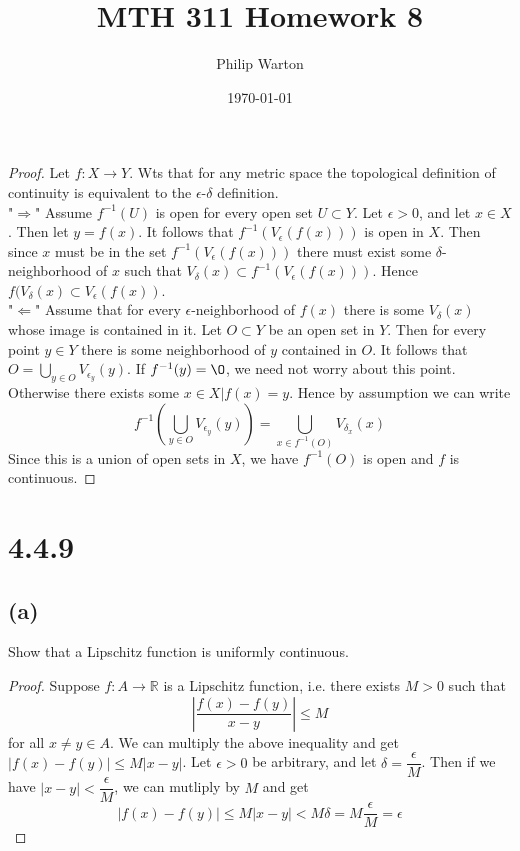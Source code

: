 \documentclass{article}
\begin{document}
\title{MTH 311 Homework 8}
\author{Philip Warton}
\date{\today}
\maketitle

\begin{proof}
Let $f: X \rightarrow Y$. Wts that for any metric space the topological definition of continuity is equivalent to the $\epsilon$-$\delta$ definition. \\
"$\Rightarrow$" Assume $f^{-1}(U)$ is open for every open set $U \subset Y$. Let $\epsilon > 0$, and let $x \in X$. Then let $y = f(x)$. It follows that $f^{-1}(V_\epsilon(f(x)))$ is open in $X$. Then since $x$ must be in the set $f^{-1}(V_\epsilon(f(x)))$ there must exist some $\delta$-neighborhood of $x$ such that $V_\delta(x) \subset f^{-1}(V_\epsilon(f(x)))$. Hence $f(V_\delta(x) \subset V_\epsilon(f(x))$. \\
"$\Leftarrow$" Assume that for every $\epsilon$-neighborhood of $f(x)$ there is some $V_\delta(x)$ whose image is contained in it. Let $O \subset Y$ be an open set in $Y$. Then for every point $y\in Y$ there is some neighborhood of $y$ contained in $O$. It follows that $O = \bigcup_{y \in O}V_{\epsilon_y}(y)$. If $f^{-1}(y) = \O$, we need not worry about this point. Otherwise there exists some $x \in X | f(x) = y$. Hence by assumption we can write \[
f^{-1}\left(\bigcup_{y \in O}V_{\epsilon_y}(y)\right) = \bigcup_{x \in f^{-1}(O)}V_{\delta_x}(x) \]
Since this is a union of open sets in $X$, we have $f^{-1}(O)$ is open and $f$ is continuous.
\end{proof}

\section*{4.4.9}
\subsection*{(a)}
Show that a Lipschitz function is uniformly continuous.
\begin{proof}
Suppose $f: A \rightarrow \mathbb{R}$ is a Lipschitz function, i.e. there exists $M>0$ such that
\[ \left|\frac{f(x)-f(y)}{x-y}\right| \leqslant M\]
for all $x \neq y \in A$. We can multiply the above inequality and get $|f(x)-f(y)| \leqslant M |x-y|$. Let $\epsilon > 0$ be arbitrary, and let $\delta = \dfrac{\epsilon}{M}$. Then if we have $|x-y| < \dfrac{\epsilon}{M}$, we can mutliply by $M$ and get 
\[ |f(x)-f(y)| \leqslant M|x-y| < M \delta = M \dfrac{\epsilon}{M} = \epsilon\]
\end{proof}
\end{document}
